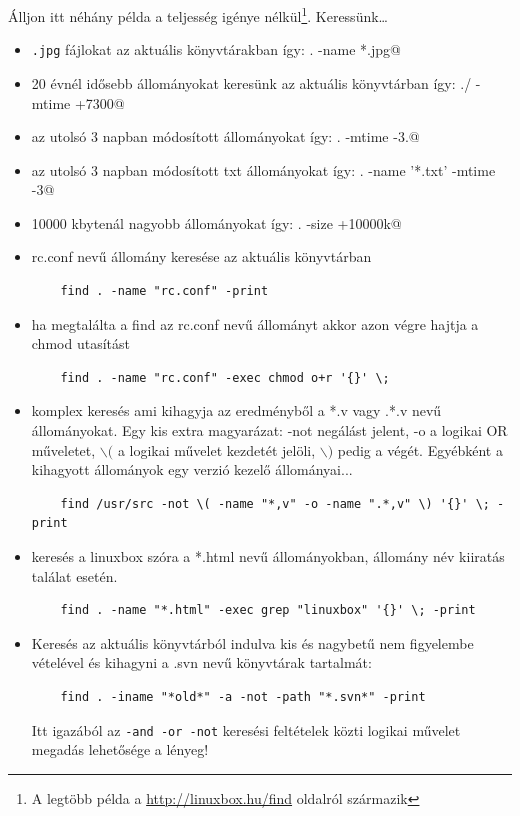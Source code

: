 	Álljon itt néhány példa a teljesség igénye  nélkül\footnote{A legtöbb példa a \url{http://linuxbox.hu/find} oldalról származik}.
	Keressünk\dots
	\begin{itemize} 
	\item  \texttt{.jpg} fájlokat az aktuális könyvtárakban így: \verb@find . -name *.jpg@

	\item 20 évnél idősebb állományokat keresünk az aktuális könyvtárban így: \verb@find ./ -mtime +7300@
	\item az utolsó 3 napban módosított állományokat így:	\verb@find . -mtime -3.@

	\item az utolsó 3 napban módosított txt állományokat így: \verb@find . -name '*.txt' -mtime -3@
	
	\item 10000 kbytenál nagyobb állományokat így: \verb@find . -size +10000k@


	\item rc.conf nevű állomány keresése az aktuális könyvtárban
	\begin{lstlisting}
	find . -name "rc.conf" -print
	\end{lstlisting}

	\item ha megtalálta a find az rc.conf nevű állományt akkor azon végre hajtja a chmod utasítást
	\begin{lstlisting}
	find . -name "rc.conf" -exec chmod o+r '{}' \;
	\end{lstlisting}

	\item komplex keresés ami kihagyja az eredményből a *.v vagy .*.v nevű állományokat. Egy kis extra ma\-gya\-rá\-zat: -not negálást jelent, -o a logikai OR műveletet, $\backslash($ a logikai művelet kezdetét jelöli, $\backslash)$ pedig a végét. Egyébként a kihagyott állományok egy verzió kezelő állományai...
	\begin{verbatim}
	find /usr/src -not \( -name "*,v" -o -name ".*,v" \) '{}' \; -print
	\end{verbatim}

	\item keresés a linuxbox szóra a *.html nevű állományokban, állomány név kiiratás találat esetén.
	\begin{lstlisting}
	find . -name "*.html" -exec grep "linuxbox" '{}' \; -print
	\end{lstlisting}

	\item Keresés az aktuális könyvtárból indulva kis és nagybetű nem figyelembe vételével és kihagyni a .svn nevű könyvtárak tartalmát:
	\begin{lstlisting}
	find . -iname "*old*" -a -not -path "*.svn*" -print
	\end{lstlisting}

	Itt igazából az \texttt{-and -or -not} keresési feltételek közti logikai művelet megadás lehetősége a lényeg!

	\end{itemize}

